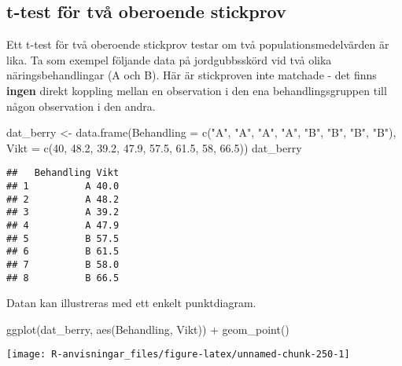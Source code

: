\documentclass[
]{book}
\newenvironment{Shaded}{\begin{snugshade}}{\end{snugshade}}
\newcommand{\AttributeTok}[1]{\textcolor[rgb]{0.77,0.63,0.00}{#1}}
\newcommand{\DecValTok}[1]{\textcolor[rgb]{0.00,0.00,0.81}{#1}}
\newcommand{\FloatTok}[1]{\textcolor[rgb]{0.00,0.00,0.81}{#1}}
\newcommand{\FunctionTok}[1]{\textcolor[rgb]{0.00,0.00,0.00}{#1}}
\newcommand{\NormalTok}[1]{#1}
\newcommand{\OtherTok}[1]{\textcolor[rgb]{0.56,0.35,0.01}{#1}}
\newcommand{\SpecialCharTok}[1]{\textcolor[rgb]{0.00,0.00,0.00}{#1}}
\newcommand{\StringTok}[1]{\textcolor[rgb]{0.31,0.60,0.02}{#1}}
\theoremstyle{definition}
\theoremstyle{definition}
\theoremstyle{definition}
\theoremstyle{definition}
\theoremstyle{remark}
\begin{document}
\hypertarget{t-test-fuxf6r-tvuxe5-oberoende-stickprov}{%
\subsection{t-test för två oberoende stickprov}\label{t-test-fuxf6r-tvuxe5-oberoende-stickprov}}

Ett t-test för två oberoende stickprov testar om två populationsmedelvärden är lika. Ta som exempel följande data på jordgubbsskörd vid två olika näringsbehandlingar (A och B). Här är stickproven inte matchade - det finns \textbf{ingen} direkt koppling mellan en observation i den ena behandlingsgruppen till någon observation i den andra.

\begin{Shaded}
\begin{Highlighting}[]
\NormalTok{dat\_berry }\OtherTok{\textless{}{-}} \FunctionTok{data.frame}\NormalTok{(}\AttributeTok{Behandling =} \FunctionTok{c}\NormalTok{(}\StringTok{"A"}\NormalTok{, }\StringTok{"A"}\NormalTok{, }\StringTok{"A"}\NormalTok{, }\StringTok{"A"}\NormalTok{, }\StringTok{"B"}\NormalTok{, }\StringTok{"B"}\NormalTok{, }\StringTok{"B"}\NormalTok{, }\StringTok{"B"}\NormalTok{),}
              \AttributeTok{Vikt =} \FunctionTok{c}\NormalTok{(}\DecValTok{40}\NormalTok{, }\FloatTok{48.2}\NormalTok{, }\FloatTok{39.2}\NormalTok{, }\FloatTok{47.9}\NormalTok{, }\FloatTok{57.5}\NormalTok{, }\FloatTok{61.5}\NormalTok{, }\DecValTok{58}\NormalTok{, }\FloatTok{66.5}\NormalTok{))}
\NormalTok{dat\_berry}
\end{Highlighting}
\end{Shaded}

\begin{verbatim}
##   Behandling Vikt
## 1          A 40.0
## 2          A 48.2
## 3          A 39.2
## 4          A 47.9
## 5          B 57.5
## 6          B 61.5
## 7          B 58.0
## 8          B 66.5
\end{verbatim}

Datan kan illustreras med ett enkelt punktdiagram.

\begin{Shaded}
\begin{Highlighting}[]
\FunctionTok{ggplot}\NormalTok{(dat\_berry, }\FunctionTok{aes}\NormalTok{(Behandling, Vikt)) }\SpecialCharTok{+}
  \FunctionTok{geom\_point}\NormalTok{()}
\end{Highlighting}
\end{Shaded}

\begin{center}\texttt{[image: R-anvisningar\_files/figure-latex/unnamed-chunk-250-1]} \end{center}
\end{document}
